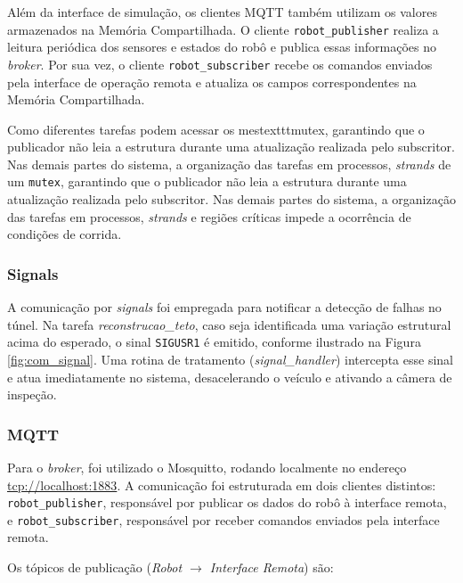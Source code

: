 \documentclass[12pt]{article}
\begin{document}
Além da interface de simulação, os clientes MQTT também utilizam os valores armazenados na Memória Compartilhada. O cliente \texttt{robot\_publisher} realiza a leitura periódica dos sensores e estados do robô e publica essas informações no \textit{broker}. Por sua vez, o cliente \texttt{robot\_subscriber} recebe os comandos enviados pela interface de operação remota e atualiza os campos correspondentes na Memória Compartilhada.

Como diferentes tarefas podem acessar os mestexttt{mutex}, garantindo que o publicador não leia a estrutura durante uma atualização realizada pelo subscritor. Nas demais partes do sistema, a organização das tarefas em processos, \textit{strands} de um \texttt{mutex}, garantindo que o publicador não leia a estrutura durante uma atualização realizada pelo subscritor. Nas demais partes do sistema, a organização das tarefas em processos, \textit{strands} e regiões críticas impede a ocorrência de condições de corrida.

\subsubsection{Signals}

A comunicação por \textit{signals} foi empregada para notificar a detecção de falhas no túnel. Na tarefa \textit{reconstrucao\_teto}, caso seja identificada uma variação estrutural acima do esperado, o sinal \texttt{SIGUSR1} é emitido, conforme ilustrado na Figura \ref{fig:com_signal}. Uma rotina de tratamento (\textit{signal\_handler}) intercepta esse sinal e atua imediatamente no sistema, desacelerando o veículo e ativando a câmera de inspeção.

\subsubsection{MQTT}
Para o \textit{broker}, foi utilizado o Mosquitto, rodando localmente no endereço \url{tcp://localhost:1883}. A comunicação foi estruturada em dois clientes distintos: \texttt{robot\_publisher}, responsável por publicar os dados do robô à interface remota, e \texttt{robot\_subscriber}, responsável por receber comandos enviados pela interface remota.

Os tópicos de publicação (\textit{Robot $\rightarrow$ Interface Remota}) são:
\end{document}
